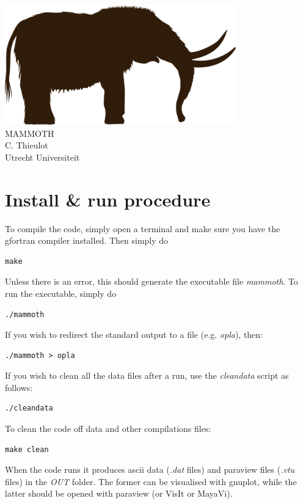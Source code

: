 \documentclass[a4paper]{article}
\begin{document}
\begin{center}
\includegraphics[width=10cm]{mammoth}\\
\vspace{4cm}
{\Large MAMMOTH}\\
C. Thieulot\\
Utrecht Universiteit
\end{center}

\newpage
\section{Install \& run procedure}

To compile the code, simply open a terminal and make sure you have the gfortran compiler installed.
Then simply do
\begin{verbatim}
make
\end{verbatim}
Unless there is an error, this should generate the executable file {\it mammoth}.
To run the executable, simply do
\begin{verbatim}
./mammoth
\end{verbatim}
If you wish to redirect the standard output to a file (e.g. {\it opla}), then:
\begin{verbatim}
./mammoth > opla
\end{verbatim}
If you wish to clean all the data files after a run, use the {\it cleandata} script as follows:
\begin{verbatim}
./cleandata
\end{verbatim}
To clean the code off data and other compilations files:
\begin{verbatim}
make clean
\end{verbatim}
When the code runs it produces ascii data ({\it *.dat} files) and 
paraview files ({\it *.vtu} files) in the {\sl OUT} folder. 
The former can be visualised with gnuplot, while the latter should be opened
with paraview (or VisIt or MayaVi).
\end{document}
